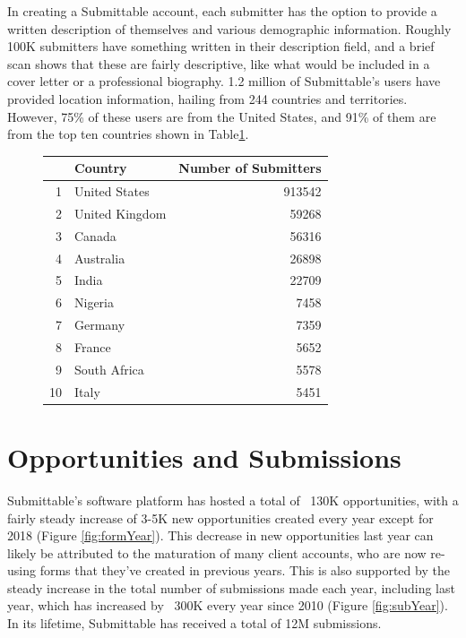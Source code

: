\documentclass[]{report}   %
\begin{document}
\FloatBarrier
In creating a Submittable account, each submitter has the option to provide a written description of themselves and various demographic information. Roughly 100K submitters have something written in their description field, and a brief scan shows that these are fairly descriptive, like what would be included in a cover letter or a professional biography. 1.2 million of Submittable's users have provided location information, hailing from 244 countries and territories. However, 75\% of these users are from the United States, and 91\% of them are from the top ten countries shown in Table\ref{table:userCountry}. 

\begin{figure}[h]
\centering
\begin{minipage}{0.45\textwidth}
     \centering
{}
\label{table:userCountry}
\begin{tabular}{rlr}
  \hline
 & Country & Number of Submitters \\ 
  \hline
1 & United States & 913542 \\ 
  2 & United Kingdom & 59268 \\ 
  3 & Canada & 56316 \\ 
  4 & Australia & 26898 \\ 
  5 & India & 22709 \\ 
  6 & Nigeria & 7458 \\ 
  7 & Germany & 7359 \\ 
  8 & France & 5652 \\ 
  9 & South Africa & 5578 \\ 
  10 & Italy & 5451 \\ 
   \hline
\end{tabular}
    \end{minipage}
\end{figure}
\FloatBarrier

\section{Opportunities and Submissions}
Submittable's software platform has hosted a total of ~130K opportunities, with a fairly steady increase of 3-5K new opportunities created every year except for 2018 (Figure \ref{fig:formYear}). This decrease in new opportunities last year can likely be attributed to the maturation of many client accounts, who are now re-using forms that they've created in previous years. This is also supported by the steady increase in the total number of submissions made each year, including last year, which has increased by ~300K every year since 2010 (Figure \ref{fig:subYear}). In its lifetime, Submittable has received a total of 12M submissions.
\end{document}
